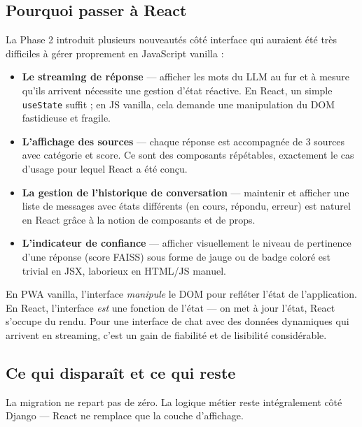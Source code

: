\documentclass[11pt,a4paper]{article}
\begin{document}
\subsection{Pourquoi passer à React}

La Phase 2 introduit plusieurs nouveautés côté interface qui auraient
été très difficiles à gérer proprement en JavaScript vanilla :

\begin{itemize}
    \item \textbf{Le streaming de réponse} --- afficher les mots du LLM
    au fur et à mesure qu'ils arrivent nécessite une gestion d'état
    réactive. En React, un simple \texttt{useState} suffit ; en JS
    vanilla, cela demande une manipulation du DOM fastidieuse et
    fragile.

    \item \textbf{L'affichage des sources} --- chaque réponse est
    accompagnée de 3 sources avec catégorie et score. Ce sont des
    composants répétables, exactement le cas d'usage pour lequel
    React a été conçu.

    \item \textbf{La gestion de l'historique de conversation} ---
    maintenir et afficher une liste de messages avec états différents
    (en cours, répondu, erreur) est naturel en React grâce à la
    notion de composants et de props.

    \item \textbf{L'indicateur de confiance} --- afficher visuellement
    le niveau de pertinence d'une réponse (score FAISS) sous forme
    de jauge ou de badge coloré est trivial en JSX, laborieux en
    HTML/JS manuel.
\end{itemize}

\begin{info}
En PWA vanilla, l'interface \textit{manipule} le DOM pour refléter
l'état de l'application. En React, l'interface \textit{est} une
fonction de l'état --- on met à jour l'état, React s'occupe
du rendu. Pour une interface de chat avec des données dynamiques
qui arrivent en streaming, c'est un gain de fiabilité et de
lisibilité considérable.
\end{info}

\subsection{Ce qui disparaît et ce qui reste}

La migration ne repart pas de zéro. La logique métier reste
intégralement côté Django --- React ne remplace que la couche
d'affichage.
\end{document}
